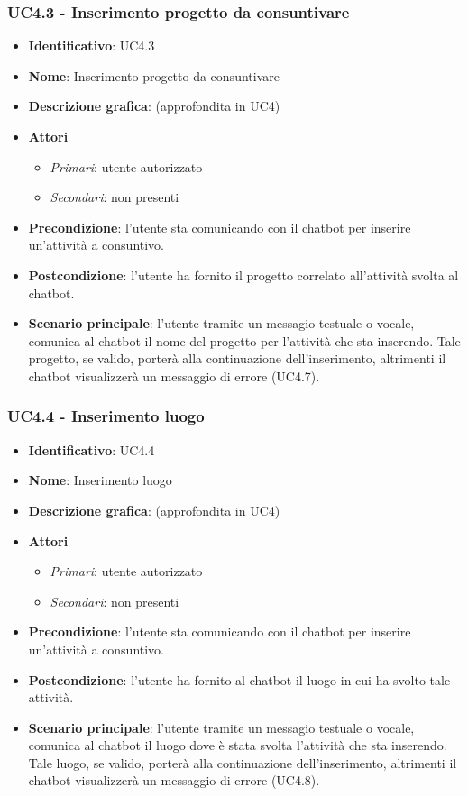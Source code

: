 \subsubsection{UC4.3 - Inserimento progetto da consuntivare}
\begin{itemize}
    \item \textbf{Identificativo}: UC4.3 
    \item \textbf{Nome}: Inserimento progetto da consuntivare  
    \item \textbf{Descrizione grafica}: (approfondita in UC4)
    \item \textbf{Attori}
        \begin{itemize} 
            \item \textit{Primari}: utente autorizzato
            \item \textit{Secondari}: non presenti
        \end{itemize}
    \item \textbf{Precondizione}: l'utente sta comunicando con il chatbot per inserire un'attività a consuntivo. 
    \item \textbf{Postcondizione}: l'utente ha fornito il progetto correlato all'attività svolta al chatbot. 
    \item \textbf{Scenario principale}: l'utente tramite un messagio testuale o vocale, comunica al chatbot il nome del progetto per l'attività che sta inserendo. Tale progetto, se valido, porterà alla continuazione dell'inserimento, altrimenti il chatbot visualizzerà un messaggio di errore (UC4.7). 
\end{itemize}

\subsubsection{UC4.4 - Inserimento luogo }
\begin{itemize}
    \item \textbf{Identificativo}: UC4.4
    \item \textbf{Nome}: Inserimento luogo   
    \item \textbf{Descrizione grafica}: (approfondita in UC4)
    \item \textbf{Attori}
        \begin{itemize} 
            \item \textit{Primari}: utente autorizzato
            \item \textit{Secondari}: non presenti
        \end{itemize}
    \item \textbf{Precondizione}: l'utente sta comunicando con il chatbot per inserire un'attività a consuntivo. 
    \item \textbf{Postcondizione}: l'utente ha fornito al chatbot il luogo in cui ha svolto tale attività. 
    \item \textbf{Scenario principale}: l'utente tramite un messagio testuale o vocale, comunica al chatbot il luogo dove è stata svolta l'attività che sta inserendo. Tale luogo, se valido, porterà alla continuazione dell'inserimento, altrimenti il chatbot visualizzerà un messaggio di errore (UC4.8). 
\end{itemize}

